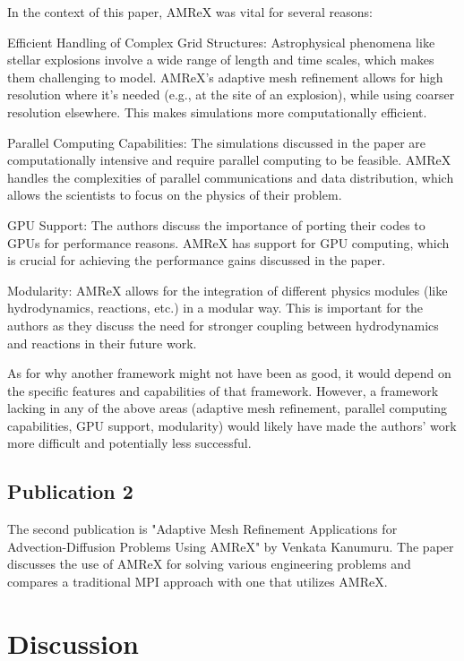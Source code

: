 \documentclass[12pt, a4paper]{scrartcl}
\begin{document}
In the context of this paper, AMReX was vital for several reasons:

Efficient Handling of Complex Grid Structures: Astrophysical phenomena like stellar explosions involve a wide 
range of length and time scales, which makes them challenging to model. AMReX's adaptive mesh refinement allows 
for high resolution where it's needed (e.g., at the site of an explosion), while using coarser resolution elsewhere. 
This makes simulations more computationally efficient.

Parallel Computing Capabilities: The simulations discussed in the paper are computationally intensive and require 
parallel computing to be feasible. AMReX handles the complexities of parallel communications and data distribution, 
which allows the scientists to focus on the physics of their problem.

GPU Support: The authors discuss the importance of porting their codes to GPUs for performance reasons. AMReX has 
support for GPU computing, which is crucial for achieving the performance gains discussed in the paper.

Modularity: AMReX allows for the integration of different physics modules (like hydrodynamics, reactions, etc.) in a 
modular way. This is important for the authors as they discuss the need for stronger coupling between hydrodynamics 
and reactions in their future work.

As for why another framework might not have been as good, it would depend on the specific features and capabilities 
of that framework. However, a framework lacking in any of the above areas (adaptive mesh refinement, parallel 
computing capabilities, GPU support, modularity) would likely have made the authors' work more difficult and 
potentially less successful.

\subsection{Publication 2}

The second publication is "Adaptive Mesh Refinement Applications for Advection-Diffusion Problems Using AMReX" by Venkata Kanumuru.
The paper discusses the use of AMReX for solving various engineering problems
and compares a traditional MPI approach with one that utilizes AMReX. 

\section{Discussion}
\end{document}
